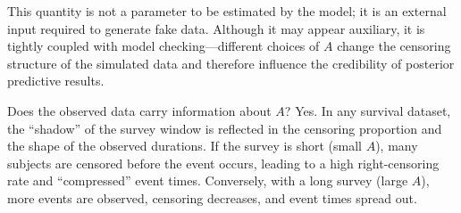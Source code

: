 This quantity is not a parameter to be estimated by the model; it is an external input required to generate fake data. Although it may appear auxiliary, it is tightly coupled with model checking—different choices of $A$ change the censoring structure of the simulated data and therefore influence the credibility of posterior predictive results.

Does the observed data carry information about $A$? Yes. In any survival dataset, the “shadow” of the survey window is reflected in the censoring proportion and the shape of the observed durations. If the survey is short (small $A$), many subjects are censored before the event occurs, leading to a high right-censoring rate and “compressed” event times. Conversely, with a long survey (large $A$), more events are observed, censoring decreases, and event times spread out.

